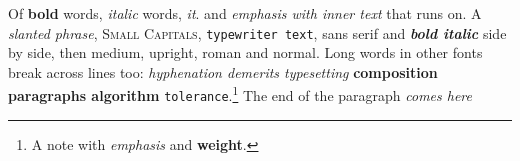 \documentclass{article}
\begin{document}
Of \textbf{bold} words, \textit{italic} words, \textit{it}. and \emph{emphasis with \emph{inner} text} that runs on. A \textsl{slanted phrase}, \textsc{Small Capitals}, \texttt{typewriter text}, \textsf{sans serif} and \textbf{\textit{bold italic}} side by side, then \textmd{medium}, \textup{upright}, \textrm{roman} and \textnormal{normal}. Long words in other fonts break across lines too: \textit{hyphenation demerits typesetting} \textbf{composition paragraphs algorithm} \texttt{tolerance}.\footnote{A note with \emph{emphasis} and \textbf{weight}.} The end of the paragraph \textit{comes here}
\end{document}
